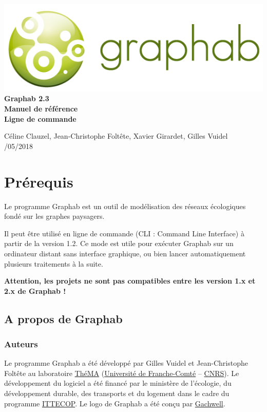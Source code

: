 \documentclass[a4paper,10pt]{report}
\begin{document}
 \begin{titlepage}
 	
 	\centering
 	\includegraphics[scale=0.5]{img/logo.png}\\
 	
 	\bigskip
 	\bigskip
 	\bigskip	
 	{\Huge
 		\bfseries
 		Graphab 2.3\\
 		\bigskip
 		Manuel de référence\\
 		Ligne de commande\\
 	}
 	\bigskip
 	\bigskip
 	\bigskip
 	\bigskip
 	\bigskip
 	
 	{\Large		
 		Céline Clauzel, Jean-Christophe Foltête, Xavier Girardet, Gilles Vuidel\\
 		/05/2018\\
 	}
 	
 \end{titlepage}




\tableofcontents

\chapter{Prérequis}

Le programme Graphab est un outil de modélisation des réseaux écologiques fondé sur les graphes paysagers.

Il peut être utilisé en ligne de commande (CLI : Command Line Interface) à partir de la version 1.2. Ce mode est utile pour exécuter Graphab sur un ordinateur distant sans interface graphique, ou bien lancer automatiquement plusieurs traitements à la suite.

\textbf{Attention, les projets ne sont pas compatibles entre les version 1.x et 2.x de Graphab !}

\section{A propos de Graphab}

\subsection{Auteurs}
Le programme Graphab a été développé par Gilles Vuidel et Jean-Christophe Foltête au laboratoire \href{http://thema.univ-fcomte.fr}{ThéMA} (\href{http://www.univ-fcomte.fr}{Université de Franche-Comté} – \href{http://www.cnrs.fr}{CNRS}). Le développement du logiciel a été financé par le ministère de l'écologie, du développement durable, des transports et du logement dans le cadre du programme \href{http://www.ittecop.fr/}{ITTECOP}. Le logo de Graphab a été conçu par \href{http://www.gachwell.com/}{Gachwell}. 
\end{document}
